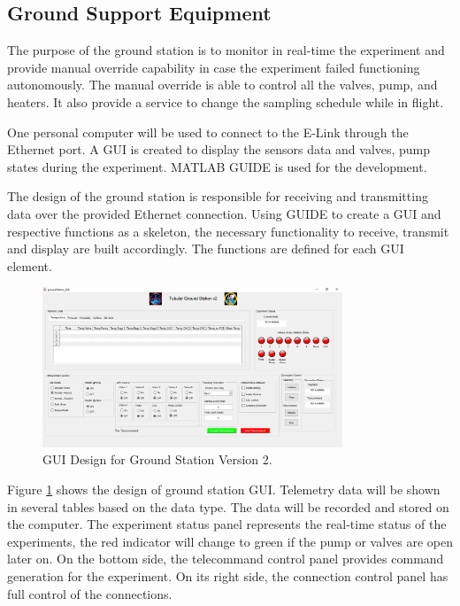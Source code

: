 \pagebreak
\subsection{Ground Support Equipment}\label{sec:4.9}
The purpose of the ground station is to monitor in real-time the experiment and provide manual override capability in case the experiment failed functioning autonomously. The manual override is able to control all the valves, pump, and heaters. It also provide a service to change the sampling schedule while in flight. \par
One personal computer will be used to connect to the E-Link through the Ethernet port. A GUI is created to display the sensors data and valves, pump states during the experiment. MATLAB GUIDE is used for the development. \par
The design of the ground station is responsible for receiving and transmitting data over the provided Ethernet connection. Using GUIDE to create a GUI and respective functions as a skeleton, the necessary  functionality to receive, transmit and display are built accordingly. The functions are defined for each GUI element.
\begin{figure}[H]
    \centering
    \includegraphics[width=0.8\textwidth]{4-experiment-design/img/GS-GUI-final.png}
    \caption{GUI Design for Ground Station Version 2.}
    \label{fig:guiDesign}
\end{figure}
Figure \ref{fig:guiDesign} shows the design of ground station GUI. Telemetry data will be shown in several tables based on the data type. The data will be recorded and stored on the computer. The experiment status panel represents the real-time status of the experiments, the red indicator will change to green if the pump or valves are open later on. On the bottom side, the telecommand control panel provides command generation for the experiment. On its right side, the connection control panel has full control of the connections.


\raggedbottom